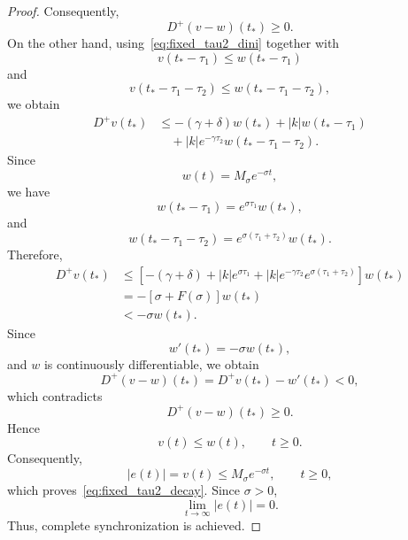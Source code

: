 \documentclass[10pt,a4paper]{amsart}
\begin{document}
\begin{proof}
Consequently,
\[
D^+(v-w)(t_*)\geq0.
\]
On the other hand, using~\eqref{eq:fixed_tau2_dini} together with
\[
v(t_*-\tau_1)\leq w(t_*-\tau_1)
\]
and
\[
v(t_*-\tau_1-\tau_2)
\leq
w(t_*-\tau_1-\tau_2),
\]
we obtain
\begin{align*}
D^+v(t_*)
&\leq
-(\gamma+\delta)w(t_*)
+|k|w(t_*-\tau_1)\\
&\quad
+|k|e^{-\gamma\tau_2}
w(t_*-\tau_1-\tau_2).
\end{align*}
Since
\[
w(t)=M_\sigma e^{-\sigma t},
\]
we have
\[
w(t_*-\tau_1)
=
e^{\sigma\tau_1}w(t_*),
\]
and
\[
w(t_*-\tau_1-\tau_2)
=
e^{\sigma(\tau_1+\tau_2)}w(t_*).
\]
Therefore,
\begin{align*}
D^+v(t_*)
&\leq
\left[
-(\gamma+\delta)
+|k|e^{\sigma\tau_1}
+|k|e^{-\gamma\tau_2}
e^{\sigma(\tau_1+\tau_2)}
\right]w(t_*)\\
&=
-\left[\sigma+F(\sigma)\right]w(t_*)\\
&<
-\sigma w(t_*).
\end{align*}
Since
\[
w'(t_*)=-\sigma w(t_*),
\]
and $w$ is continuously differentiable, we obtain
\[
D^+(v-w)(t_*)
=
D^+v(t_*)-w'(t_*)
<0,
\]
which contradicts
\[
D^+(v-w)(t_*)\geq0.
\]
Hence
\[
v(t)\leq w(t),
\qquad t\geq0.
\]
Consequently,
\[
|e(t)|
=
v(t)
\leq
M_\sigma e^{-\sigma t},
\qquad t\geq0,
\]
which proves~\eqref{eq:fixed_tau2_decay}. Since $\sigma>0$,
\[
\lim_{t\to\infty}|e(t)|=0.
\]
Thus, complete synchronization is achieved.
\end{proof}
\end{document}
